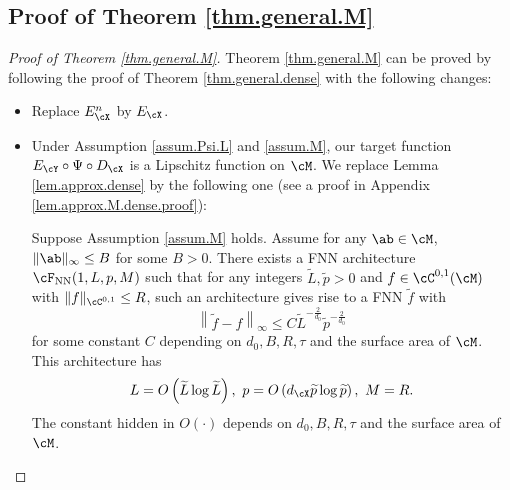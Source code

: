 \documentclass[11pt]{article} %
\begin{document}
\subsection{Proof of Theorem \ref{thm.general.M}}\label{thm.general.M.proof}
\begin{proof}[Proof of Theorem \ref{thm.general.M}]
	Theorem \ref{thm.general.M} can be proved by following the proof of Theorem \ref{thm.general.dense} with the following changes:
	\begin{itemize}
		\item Replace $E_{\cX}^n$ by $E_{\cX}$.
		\item Under Assumption \ref{assum.Psi.L} and \ref{assum.M}, our target function $E_{\cY}\circ\Psi\circ D_{\cX}$ is a Lipschitz function on $\cM$. We replace Lemma \ref{lem.approx.dense} by the following one (see a proof in Appendix \ref{lem.approx.M.dense.proof}):
		\begin{lemma}
			\label{lem.approx.M.dense}
			Suppose Assumption \ref{assum.M} holds. Assume for any $\ab\in\cM$, $\|\ab\|_{\infty}\leq B$ for some $B>0$. There exists a FNN architecture $\cF_{\rm NN}(1,L,p,M)$ such that for any integers $\widetilde{L},\widetilde{p}>0$ and $f\in \cC^{0,1}(\cM)$ with $\|f\|_{\cC^{0,1}}\leq R$, such an architecture gives rise to a FNN $\widetilde{f}$ with
			$$
			\left\|\widetilde{f}-f\right\|_{\infty}\leq C\widetilde{L}^{-\frac{2}{d_0}}\widetilde{p}^{-\frac{2}{d_0}}
			$$
			for some constant $C$ depending on  $d_0,B,R,\tau$ and the surface area of $\cM$.
			This architecture has
			\begin{align}
				L=O\left(\widetilde{L}\log \widetilde{L}\right), \ p=O\left(d_{\cX}\widetilde{p}\log \widetilde{p}\right),\ M=R.
				\label{eq.NN.parameter.n.M.dense.lemma}
			\end{align}
			The constant hidden in $O(\cdot)$ depends on $d_0,B,R,\tau$ and the surface area of $\cM$.
			
			
			

\end{lemma}
\end{itemize}
\end{proof}
\end{document}
